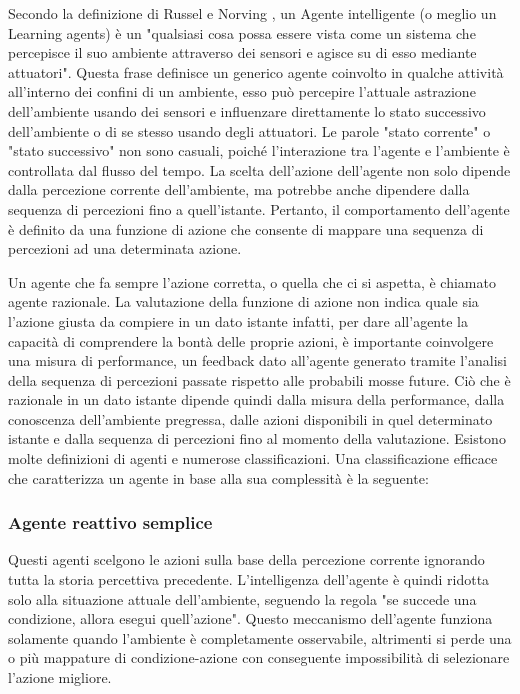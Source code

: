 \documentclass[11pt]{article}
\begin{document}
Secondo la definizione di Russel e Norving \cite{RusselNorvig}, un Agente intelligente (o meglio un Learning agents) è un "qualsiasi cosa possa essere vista come un sistema che percepisce il suo ambiente attraverso dei sensori e agisce su di esso mediante attuatori".
Questa frase definisce un generico agente coinvolto in qualche attività all'interno dei confini di un ambiente, esso può percepire l'attuale astrazione dell'ambiente usando dei sensori e influenzare direttamente lo stato successivo dell'ambiente o di se stesso usando degli attuatori. Le parole "stato corrente" o "stato successivo" non sono casuali, poiché l'interazione tra l’agente e l'ambiente è controllata dal flusso del tempo. La scelta dell'azione dell'agente non solo dipende dalla percezione corrente dell'ambiente, ma potrebbe anche dipendere dalla sequenza di percezioni fino a quell'istante. Pertanto, il comportamento dell'agente è definito da una funzione di azione che consente di mappare una sequenza di percezioni ad una determinata azione.

Un agente che fa sempre l'azione corretta, o quella che ci si aspetta, è chiamato agente razionale.
La valutazione della funzione di azione non indica quale sia l'azione giusta da compiere in un dato istante infatti, per dare all'agente la capacità di comprendere la bontà delle proprie azioni, è importante coinvolgere una misura di performance, un feedback dato all'agente generato tramite l'analisi della sequenza di percezioni passate rispetto alle probabili mosse future.
Ciò che è razionale in un dato istante dipende quindi dalla misura della performance, dalla conoscenza dell'ambiente pregressa, dalle azioni disponibili in quel determinato istante e dalla sequenza di percezioni fino al momento della valutazione.
Esistono molte definizioni di agenti e numerose classificazioni. Una classificazione efficace che caratterizza un agente in base alla sua complessità è la seguente:

\subsubsection{Agente reattivo semplice}
Questi agenti scelgono le azioni sulla base della percezione corrente ignorando tutta la storia percettiva precedente.
L'intelligenza dell'agente è quindi ridotta solo alla situazione attuale dell'ambiente, seguendo la regola "se succede una condizione, allora esegui quell'azione". Questo meccanismo dell'agente funziona solamente quando l'ambiente è completamente osservabile, altrimenti si perde una o più mappature di condizione-azione con conseguente impossibilità di selezionare l'azione migliore.
\end{document}
